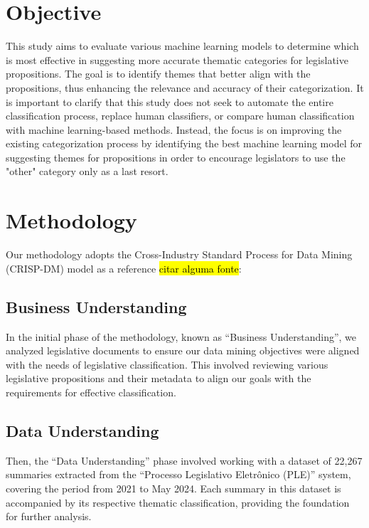 \documentclass[12pt]{article}
\newcommand{\todo}[1]{\hl{#1}}
\begin{document}
\section{Objective}

This study aims to evaluate various machine learning models to determine which is most effective in suggesting more accurate thematic categories for legislative propositions. The goal is to identify themes that better align with the propositions, thus enhancing the relevance and accuracy of their categorization. It is important to clarify that this study does not seek to automate the entire classification process, replace human classifiers, or compare human classification with machine learning-based methods. Instead, the focus is on improving the existing categorization process by identifying the best machine learning model for suggesting themes for propositions in order to encourage legislators to use the "other" category only as a last resort.

\section{Methodology}

Our methodology adopts the Cross-Industry Standard Process for Data Mining (CRISP-DM) model as a reference \todo{citar alguma fonte}:

\subsection{Business Understanding}

In the initial phase of the methodology, known as ``Business Understanding'', we analyzed legislative documents to ensure our data mining objectives were aligned with the needs of legislative classification. This involved reviewing various legislative propositions and their metadata to align our goals with the requirements for effective classification.

\subsection{Data Understanding}

Then, the ``Data Understanding'' phase involved working with a dataset of 22,267 summaries extracted from the “Processo Legislativo Eletrônico (PLE)” system, covering the period from 2021 to May 2024. Each summary in this dataset is accompanied by its respective thematic classification, providing the foundation for further analysis.
\end{document}
